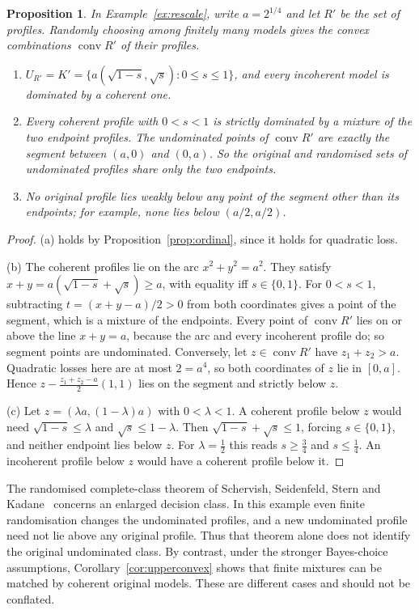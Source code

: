 \documentclass[11pt]{article}
\newtheorem{proposition}[theorem]{Proposition}
\theoremstyle{definition}
\theoremstyle{remark}
\newcommand{\co}{\operatorname{conv}}
\begin{document}
\begin{proposition}\label{prop:random}
In Example~\ref{ex:rescale}, write $a=2^{1/4}$ and let $R'$ be the set of profiles. Randomly choosing among finitely many models gives the convex combinations $\co R'$ of their profiles.
\begin{enumerate}[label=(\alph*)]
\item $U_{R'}=K'=\{a(\sqrt{1-s},\sqrt s):0\le s\le1\}$, and every incoherent model is dominated by a coherent one.
\item Every coherent profile with $0<s<1$ is strictly dominated by a mixture of the two endpoint profiles. The undominated points of $\co R'$ are exactly the segment between $(a,0)$ and $(0,a)$. So the original and randomised sets of undominated profiles share only the two endpoints.
\item No original profile lies weakly below any point of the segment other than its endpoints; for example, none lies below $(a/2,a/2)$.
\end{enumerate}
\end{proposition}
\begin{proof}
(a) holds by Proposition~\ref{prop:ordinal}, since it holds for quadratic loss.

(b) The coherent profiles lie on the arc $x^2+y^2=a^2$. They satisfy $x+y=a(\sqrt{1-s}+\sqrt s)\ge a$, with equality iff $s\in\{0,1\}$. For $0<s<1$, subtracting $t=(x+y-a)/2>0$ from both coordinates gives a point of the segment, which is a mixture of the endpoints. Every point of $\co R'$ lies on or above the line $x+y=a$, because the arc and every incoherent profile do; so segment points are undominated. Conversely, let $z\in\co R'$ have $z_1+z_2>a$. Quadratic losses here are at most $2=a^4$, so both coordinates of $z$ lie in $[0,a]$. Hence $z-\tfrac{z_1+z_2-a}2(1,1)$ lies on the segment and strictly below $z$.

(c) Let $z=(\lambda a,(1-\lambda)a)$ with $0<\lambda<1$. A coherent profile below $z$ would need $\sqrt{1-s}\le\lambda$ and $\sqrt s\le1-\lambda$. Then $\sqrt{1-s}+\sqrt s\le1$, forcing $s\in\{0,1\}$, and neither endpoint lies below $z$. For $\lambda=\tfrac12$ this reads $s\ge\tfrac34$ and $s\le\tfrac14$. An incoherent profile below $z$ would have a coherent profile below it.
\end{proof}

The randomised complete-class theorem of Schervish, Seidenfeld, Stern and Kadane~\cite[Theorem~1]{SSSK} concerns an enlarged decision class. In this example even finite randomisation changes the undominated profiles, and a new undominated profile need not lie above any original profile. Thus that theorem alone does not identify the original undominated class. By contrast, under the stronger Bayes-choice assumptions, Corollary~\ref{cor:upperconvex} shows that finite mixtures can be matched by coherent original models. These are different cases and should not be conflated.
\end{document}
